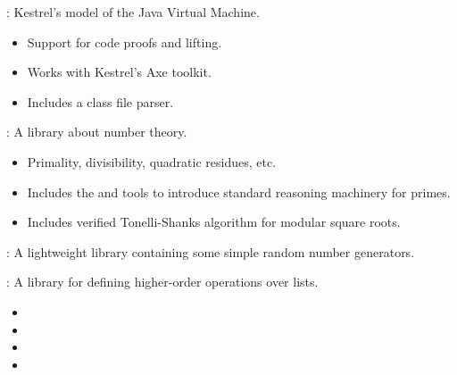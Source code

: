 
\begin{frame}

\newlibtitle

:
Kestrel's model of the Java Virtual Machine.
\begin{itemize}
\item Support for code proofs and lifting.
\item Works with Kestrel's Axe toolkit.
\item Includes a class file parser.
\end{itemize}

\end{frame}


\begin{frame}

\newlibtitle

:
A library about number theory.
\begin{itemize}
\item Primality, divisibility, quadratic residues, etc.
\item Includes the  and  tools to
  introduce standard reasoning machinery for primes.
\item Includes verified Tonelli-Shanks algorithm for modular square roots.
\end{itemize}

\end{frame}


\begin{frame}

\newlibtitle

:
A lightweight library containing some simple random number generators.

\end{frame}


\begin{frame}

\newlibtitle

:
A library for defining higher-order operations over lists.
\begin{itemize}
\item {}
\item {}
\item {}
\item {}
\end{itemize}
\end{frame}

